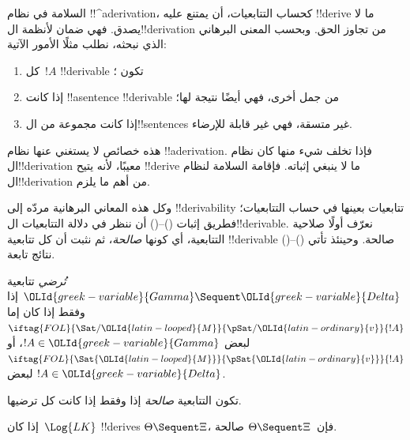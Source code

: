 \documentclass[../../../include/open-logic-section]{subfiles}
\begin{document}
      {}
      {}


\begin{explain}
السلامة في نظام !!^a{derivation}، كحساب التتابعيات، أن يمتنع عليه
!!{derive} ما لا يصدق. فهي ضمان لأنظمة ال!!{derivation} من تجاوز الحق.
وبحسب المعنى البرهاني الذي نبحثه، نطلب مثلًا الأمور الآتية:
\begin{enumerate}
\item كل~$!A$ !!{derivable} تكون ؛
\item إذا كانت !!a{sentence} !!{derivable} من جمل أخرى، فهي أيضًا
  نتيجة لها؛
\item إذا كانت مجموعة من ال!!{sentence}s غير متسقة، فهي غير قابلة
  للإرضاء.
\end{enumerate}
هذه خصائص لا يستغني عنها نظام !!a{derivation}. فإذا تخلف شيء منها كان نظام ال!!{derivation} معيبًا، لأنه يتيح
!!{derive} ما لا ينبغي إثباته. فإقامة السلامة لنظام ال!!{derivation} من أهم ما يلزم.

وكل هذه المعاني البرهانية مردّه إلى
!!{derivability} تتابعيات بعينها في حساب التتابعيات؛ فطريق إثبات
()--() أن ننظر في دلالة التتابعيات ال!!{derivable}.
نعرّف أولًا صلاحية التتابعية، أي كونها \emph{صالحة}، ثم نثبت أن كل تتابعية
!!{derivable} صالحة. وحينئذ تأتي ()--() نتائج تابعة.
\end{explain}

\begin{defn}
 \emph{تُرضي} تتابعية
$\OLId{greek-variable}{Gamma} \Sequent \OLId{greek-variable}{Delta}$ إذا وفقط إذا كان إما
$\iftag{FOL}{\Sat/{\OLId{latin-looped}{M}}}{\pSat/{\OLId{latin-ordinary}{v}}}{!A}$ لبعض $!A \in \OLId{greek-variable}{Gamma}$، أو
$\iftag{FOL}{\Sat{\OLId{latin-looped}{M}}}{\pSat{\OLId{latin-ordinary}{v}}}{!A}$ لبعض $!A \in \OLId{greek-variable}{Delta}$.

تكون التتابعية \emph{صالحة} إذا وفقط إذا كانت كل
ترضيها.
\end{defn}

\begin{thm}[السلامة]
 إذا كان~$\Log{LK}$ !!{derive}s
$\Theta \Sequent \Xi$، فإن~$\Theta \Sequent \Xi$ صالحة.
\end{thm}
\end{document}
